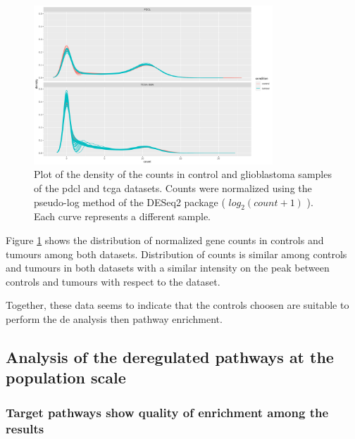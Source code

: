 \begin{figure}
    \begin{center}
        \includegraphics[width=0.8\textwidth]{img/density_plot}
        \caption{
            Plot of the density of the counts in control and glioblastoma samples of the \acrshort{pdcl} and \acrshort{tcga} datasets.
            Counts were normalized using the pseudo-log method of the DESeq2 package ( $log_2(count+1)$ ).
            Each curve represents a different sample.
        }
        \label{fig:density-plot}
    \end{center}
\end{figure}

Figure \ref*{fig:density-plot} shows the distribution of normalized gene counts in controls and tumours among both datasets.
Distribution of counts is similar among controls and tumours in both datasets with a similar intensity on the peak between controls and tumours with respect to the dataset.

Together, these data seems to indicate that the controls choosen are suitable to perform the \acrlong{de} analysis then pathway enrichment.

\subsection{Analysis of the deregulated pathways at the population scale}

\subsubsection{Target pathways show quality of enrichment among the results}

